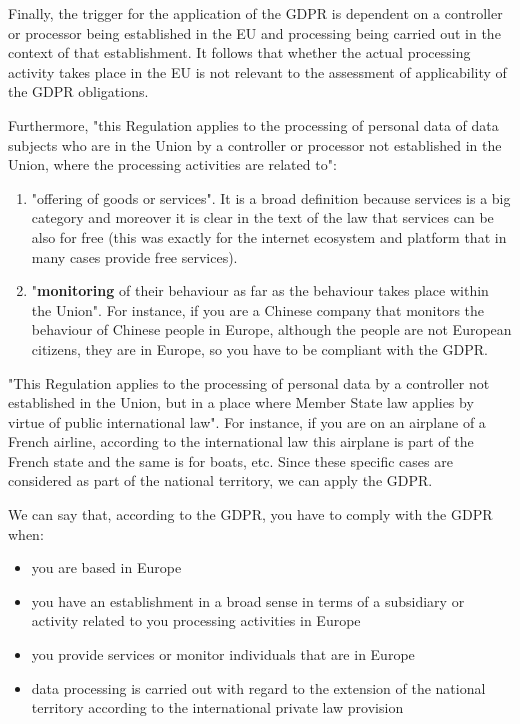 Finally, the trigger for the application of the GDPR is dependent on a controller or processor being established in the EU and processing being carried out in the context of that establishment. It follows that whether the actual processing activity takes place in the EU is not relevant to the assessment of applicability of the GDPR obligations.


Furthermore, "this Regulation applies to the processing of personal data of data subjects who are in the Union by a controller or processor not established in the Union, where the processing activities are related to":
\begin{enumerate}
    \item "offering of goods or services". It is a broad definition because services is a big category and moreover it is clear in the text of the law that services can be also for free (this was exactly for the internet ecosystem and platform that in many cases provide free services).
    \item "\textbf{monitoring} of their behaviour as far as the behaviour takes place within the Union". For instance, if you are a Chinese company that monitors the behaviour of Chinese people in Europe, although the people are not European citizens, they are in Europe, so you have to be compliant with the GDPR.
\end{enumerate}
"This Regulation applies to the processing of personal data by a controller not established in the Union, but in a place where Member State law applies by virtue of public international law". For instance, if you are on an airplane of a French airline, according to the international law this airplane is part of the French state and the same is for boats, etc. Since these specific cases are considered as part of the national territory, we can apply the GDPR.

We can say that, according to the GDPR, you have to comply with the GDPR when:
\begin{itemize}
    \item you are based in Europe
    \item you have an establishment in a broad sense in terms of a subsidiary or activity related to you processing activities in Europe
    \item you provide services or monitor individuals that are in Europe
    \item data processing is carried out with regard to the extension of the national territory according to the international private law provision
\end{itemize}
